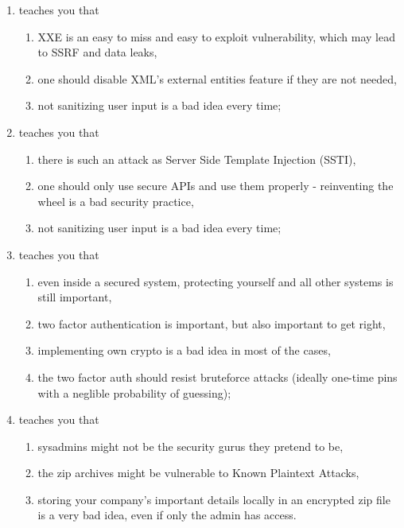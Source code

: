 \documentclass[a4paper]{article}
\begin{document}
\begin{enumerate}
  \item teaches you that
        \begin{enumerate}
          \item XXE is an easy to miss and easy to exploit vulnerability, which may lead to SSRF and data leaks,
          \item one should disable XML's external entities feature if they are not needed,
          \item not sanitizing user input is a bad idea every time;
        \end{enumerate}

  \item teaches you that
        \begin{enumerate}
          \item there is such an attack as Server Side Template Injection (SSTI),
          \item one should only use secure APIs and use them properly - reinventing the wheel is a bad security practice,
          \item not sanitizing user input is a bad idea every time;
        \end{enumerate}

  \item teaches you that
        \begin{enumerate}
          \item even inside a secured system, protecting yourself and all other systems
                is still important,
          \item two factor authentication is important, but also important to get right,
          \item implementing own crypto is a bad idea in most of the cases,
          \item the two factor auth should resist bruteforce attacks (ideally one-time pins with a neglible probability of guessing);
        \end{enumerate}

  \item teaches you that
        \begin{enumerate}
          \item sysadmins might not be the security gurus they pretend to be,
          \item the zip archives might be vulnerable to Known Plaintext Attacks,
          \item storing your company's important details locally in an encrypted zip
                file is a very bad idea, even if only the admin has access.
        \end{enumerate}

\end{enumerate}
\end{document}
